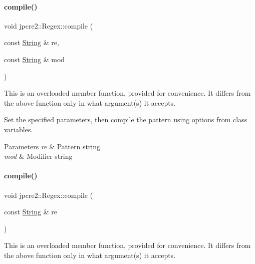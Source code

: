 \paragraph{\texorpdfstring{compile()}{compile()}\hspace{0.1cm}{\footnotesize\ttfamily [4/5]}}
{\footnotesize\ttfamily void jpcre2\+::\+Regex\+::compile (\begin{DoxyParamCaption}\item[{const \hyperlink{namespacejpcre2_a91f03070152fb228bc116c5a737f1d16}{String} \&}]{re,  }\item[{const \hyperlink{namespacejpcre2_a91f03070152fb228bc116c5a737f1d16}{String} \&}]{mod }\end{DoxyParamCaption})\hspace{0.3cm}{\ttfamily [inline]}}



This is an overloaded member function, provided for convenience. It differs from the above function only in what argument(s) it accepts. 

Set the specified parameters, then compile the pattern using options from class variables. 
\begin{DoxyParams}{Parameters}
{\em re} & Pattern string \\
\hline
{\em mod} & Modifier string \\
\hline
\end{DoxyParams}
\hypertarget{classjpcre2_1_1Regex_a81687ca434654cae776c2854c3618de0_a81687ca434654cae776c2854c3618de0}{}\label{classjpcre2_1_1Regex_a81687ca434654cae776c2854c3618de0_a81687ca434654cae776c2854c3618de0} 
\paragraph{\texorpdfstring{compile()}{compile()}\hspace{0.1cm}{\footnotesize\ttfamily [5/5]}}
{\footnotesize\ttfamily void jpcre2\+::\+Regex\+::compile (\begin{DoxyParamCaption}\item[{const \hyperlink{namespacejpcre2_a91f03070152fb228bc116c5a737f1d16}{String} \&}]{re }\end{DoxyParamCaption})\hspace{0.3cm}{\ttfamily [inline]}}



This is an overloaded member function, provided for convenience. It differs from the above function only in what argument(s) it accepts. 

